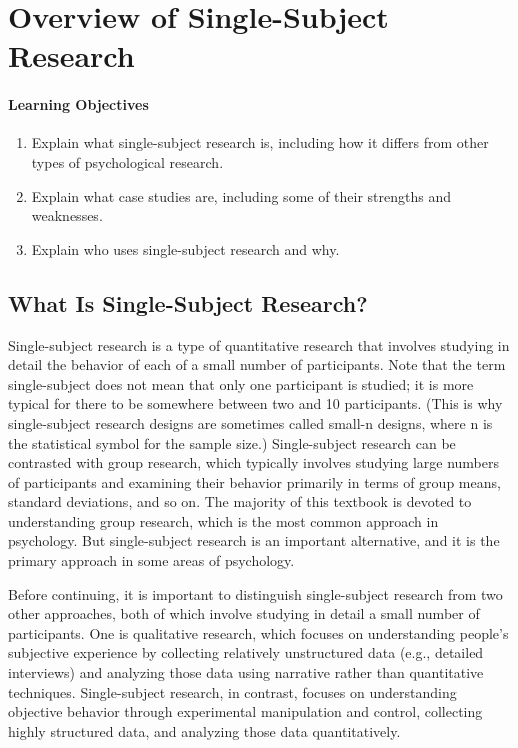 \section{Overview of Single-Subject Research}

\paragraph{Learning Objectives}
 \begin{enumerate}
 \item  Explain what single-subject research is, including how it differs from other types of psychological research.
 \item Explain what case studies are, including some of their strengths and weaknesses.
 \item Explain who uses single-subject research and why.
   \end{enumerate}


\subsection{What Is Single-Subject Research?}

Single-subject research is a type of quantitative research that involves studying in detail the behavior of each of a small number of participants. Note that the term single-subject does not mean that only one participant is studied; it is more typical for there to be somewhere between two and 10 participants. (This is why single-subject research designs are sometimes called small-n designs, where n is the statistical symbol for the sample size.) Single-subject research can be contrasted with group research, which typically involves studying large numbers of participants and examining their behavior primarily in terms of group means, standard deviations, and so on. The majority of this textbook is devoted to understanding group research, which is the most common approach in psychology. But single-subject research is an important alternative, and it is the primary approach in some areas of psychology.

Before continuing, it is important to distinguish single-subject research from two other approaches, both of which involve studying in detail a small number of participants. One is qualitative research, which focuses on understanding people's subjective experience by collecting relatively unstructured data (e.g., detailed interviews) and analyzing those data using narrative rather than quantitative techniques. Single-subject research, in contrast, focuses on understanding objective behavior through experimental manipulation and control, collecting highly structured data, and analyzing those data quantitatively.

